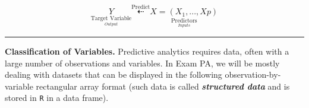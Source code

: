 \documentclass[
  12pt,
]{krantz}
\begin{document}
\[\begin{equation}
\underset{\underset{Output}{\text{Target Variable}}}{Y} \overset{\text{Predict}}{\underset{\text{}}{\dashleftarrow}}\underset{\underset{Inputs}{\text{Predictors}}}{X = (X_1,...,Xp)}
\label{eq:inputoutput}
\end{equation}
\]

\begin{center}\rule{0.5\linewidth}{0.5pt}\end{center}

\textbf{Classification of Variables.} Predictive analytics requires data, often with
a large number of observations and variables. In Exam PA, we will be mostly
dealing with datasets that can be displayed in the following
observation-by-variable rectangular array format (such data is called
\textbf{\emph{structured data}} and is stored in \texttt{R} in a data frame).
\end{document}

